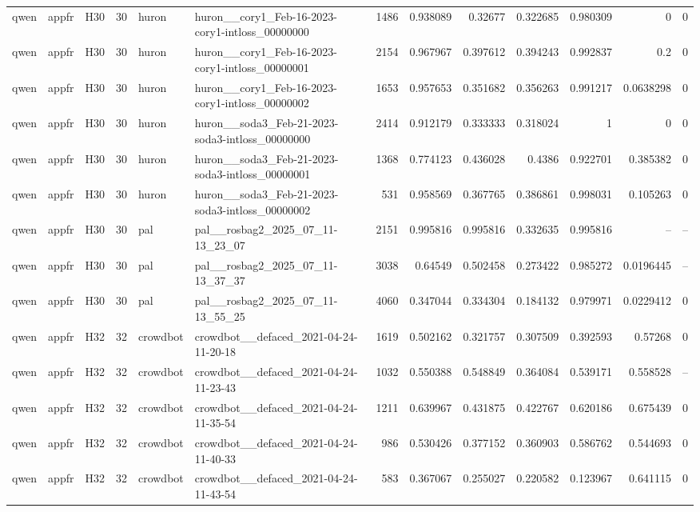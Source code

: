 \begin{longtable}{lllrllrrrrrrr}
qwen & appfr & H30 & 30 & huron & huron\_\_cory1\_Feb-16-2023-cory1-intloss\_00000000 & 1486 & 0.938089 & 0.32677 & 0.322685 & 0.980309 & 0 & 0 \\
qwen & appfr & H30 & 30 & huron & huron\_\_cory1\_Feb-16-2023-cory1-intloss\_00000001 & 2154 & 0.967967 & 0.397612 & 0.394243 & 0.992837 & 0.2 & 0 \\
qwen & appfr & H30 & 30 & huron & huron\_\_cory1\_Feb-16-2023-cory1-intloss\_00000002 & 1653 & 0.957653 & 0.351682 & 0.356263 & 0.991217 & 0.0638298 & 0 \\
qwen & appfr & H30 & 30 & huron & huron\_\_soda3\_Feb-21-2023-soda3-intloss\_00000000 & 2414 & 0.912179 & 0.333333 & 0.318024 & 1 & 0 & 0 \\
qwen & appfr & H30 & 30 & huron & huron\_\_soda3\_Feb-21-2023-soda3-intloss\_00000001 & 1368 & 0.774123 & 0.436028 & 0.4386 & 0.922701 & 0.385382 & 0 \\
qwen & appfr & H30 & 30 & huron & huron\_\_soda3\_Feb-21-2023-soda3-intloss\_00000002 & 531 & 0.958569 & 0.367765 & 0.386861 & 0.998031 & 0.105263 & 0 \\
qwen & appfr & H30 & 30 & pal & pal\_\_rosbag2\_2025\_07\_11-13\_23\_07 & 2151 & 0.995816 & 0.995816 & 0.332635 & 0.995816 & -- & -- \\
qwen & appfr & H30 & 30 & pal & pal\_\_rosbag2\_2025\_07\_11-13\_37\_37 & 3038 & 0.64549 & 0.502458 & 0.273422 & 0.985272 & 0.0196445 & -- \\
qwen & appfr & H30 & 30 & pal & pal\_\_rosbag2\_2025\_07\_11-13\_55\_25 & 4060 & 0.347044 & 0.334304 & 0.184132 & 0.979971 & 0.0229412 & 0 \\
qwen & appfr & H32 & 32 & crowdbot & crowdbot\_\_defaced\_2021-04-24-11-20-18 & 1619 & 0.502162 & 0.321757 & 0.307509 & 0.392593 & 0.57268 & 0 \\
qwen & appfr & H32 & 32 & crowdbot & crowdbot\_\_defaced\_2021-04-24-11-23-43 & 1032 & 0.550388 & 0.548849 & 0.364084 & 0.539171 & 0.558528 & -- \\
qwen & appfr & H32 & 32 & crowdbot & crowdbot\_\_defaced\_2021-04-24-11-35-54 & 1211 & 0.639967 & 0.431875 & 0.422767 & 0.620186 & 0.675439 & 0 \\
qwen & appfr & H32 & 32 & crowdbot & crowdbot\_\_defaced\_2021-04-24-11-40-33 & 986 & 0.530426 & 0.377152 & 0.360903 & 0.586762 & 0.544693 & 0 \\
qwen & appfr & H32 & 32 & crowdbot & crowdbot\_\_defaced\_2021-04-24-11-43-54 & 583 & 0.367067 & 0.255027 & 0.220582 & 0.123967 & 0.641115 & 0 \\

\end{longtable}
